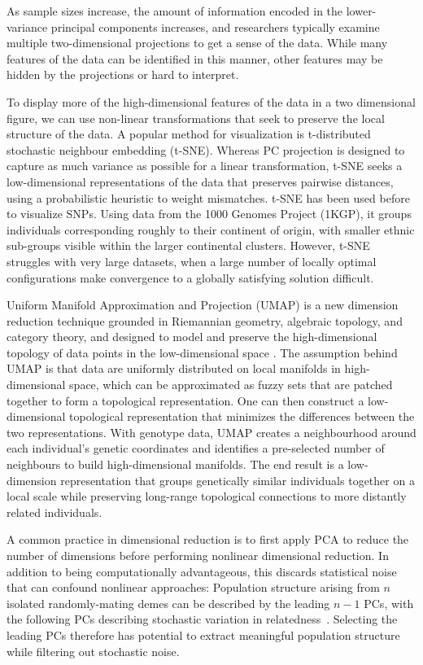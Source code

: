 \documentclass[12pt]{pnas-new}
\begin{document}
As sample sizes increase, the amount of information encoded in the lower-variance principal components increases, and researchers typically examine multiple two-dimensional projections to get a sense of the data. While many features of the data can be identified in this manner, other features may be hidden by the projections or hard to interpret.     

To display more of the high-dimensional features of the data in a two dimensional figure,  we can use non-linear transformations that seek to preserve the local structure of the data. A popular method for visualization is t-distributed stochastic neighbour embedding (t-SNE)\cite{maaten2008visualizing}. Whereas PC projection is designed to capture as much variance as possible for a linear transformation, t-SNE seeks a low-dimensional representations of the data that preserves pairwise distances, using a probabilistic heuristic to weight mismatches. t-SNE has been used before to visualize SNPs\cite{platzer2013visualization}. Using data from the 1000 Genomes Project (1KGP)\cite{10002015global}, it groups individuals corresponding roughly to their continent of origin, with smaller ethnic sub-groups visible within the larger continental clusters\cite{li2017tsne}. However, t-SNE struggles with very large datasets, when a large number of locally optimal configurations make convergence to a globally satisfying solution difficult. 

Uniform Manifold Approximation and Projection (UMAP) is a new dimension reduction technique grounded in Riemannian geometry, algebraic topology, and category theory, and designed to model and preserve the high-dimensional topology of data points in the low-dimensional space \cite{2018arXivUMAP}. The assumption behind UMAP is that data are uniformly distributed on local manifolds in high-dimensional space, which can be approximated as fuzzy sets that are patched together to form a topological representation. One can then construct a low-dimensional topological representation that minimizes the differences between the two representations. With genotype data, UMAP creates a neighbourhood around each individual's genetic coordinates and identifies a pre-selected number of neighbours to build high-dimensional manifolds. The end result is a low-dimension representation that groups genetically similar individuals together on a local scale while preserving long-range topological connections to more distantly related individuals. 

A common practice in dimensional reduction is to first apply PCA to reduce the number of dimensions before performing nonlinear dimensional reduction. In addition to being computationally advantageous, this discards statistical noise that can confound nonlinear approaches: Population structure arising from $n$ isolated randomly-mating demes can be described by the leading $n-1$ PCs, with the following PCs describing stochastic variation in relatedness~\cite{eigen2006}. Selecting the leading PCs therefore has potential to extract meaningful population structure while filtering out stochastic noise.
\end{document}
